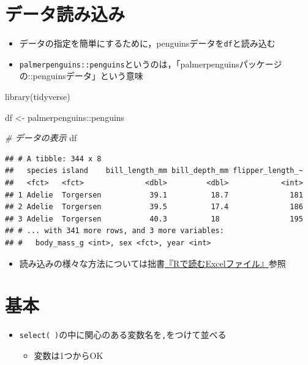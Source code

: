 \documentclass[
  xelatex,ja=standard, b5paper]{bxjsbook}
\newenvironment{Shaded}{\begin{snugshade}}{\end{snugshade}}
\newcommand{\CommentTok}[1]{\textcolor[rgb]{0.56,0.35,0.01}{\textit{#1}}}
\newcommand{\FunctionTok}[1]{\textcolor[rgb]{0.00,0.00,0.00}{#1}}
\newcommand{\NormalTok}[1]{#1}
\newcommand{\OtherTok}[1]{\textcolor[rgb]{0.56,0.35,0.01}{#1}}
\newcommand{\SpecialCharTok}[1]{\textcolor[rgb]{0.00,0.00,0.00}{#1}}
\providecommand{\tightlist}{%
  \setlength{\itemsep}{0pt}\setlength{\parskip}{0pt}}
\begin{document}
\hypertarget{select-read}{%
\section{データ読み込み}\label{select-read}}

\begin{itemize}
\tightlist
\item
  データの指定を簡単にするために，penguinsデータを\texttt{df}と読み込む
\item
  \texttt{palmerpenguins::penguins}というのは，「palmerpenguinsパッケージの::penguinsデータ」という意味
\end{itemize}

\begin{Shaded}
\begin{Highlighting}[]
\FunctionTok{library}\NormalTok{(tidyverse)}

\NormalTok{df }\OtherTok{\textless{}{-}} 
\NormalTok{  palmerpenguins}\SpecialCharTok{::}\NormalTok{penguins}

\CommentTok{\# データの表示  }
\NormalTok{df }
\end{Highlighting}
\end{Shaded}

\begin{verbatim}
## # A tibble: 344 x 8
##   species island    bill_length_mm bill_depth_mm flipper_length_~
##   <fct>   <fct>              <dbl>         <dbl>            <int>
## 1 Adelie  Torgersen           39.1          18.7              181
## 2 Adelie  Torgersen           39.5          17.4              186
## 3 Adelie  Torgersen           40.3          18                195
## # ... with 341 more rows, and 3 more variables:
## #   body_mass_g <int>, sex <fct>, year <int>
\end{verbatim}

\begin{itemize}
\tightlist
\item
  読み込みの様々な方法については拙書\href{https://izunyan.github.io/excel_r/}{『Rで読むExcelファイル』}参照
\end{itemize}

\hypertarget{select-standard}{%
\section{基本}\label{select-standard}}

\begin{itemize}
\tightlist
\item
  \texttt{select(\ )}の中に関心のある変数名を\texttt{,}をつけて並べる

  \begin{itemize}
  \tightlist
  \item
    変数は1つからOK
  \end{itemize}
\end{itemize}
\end{document}
